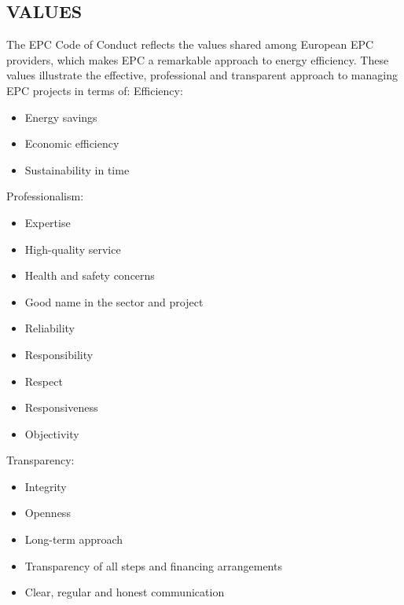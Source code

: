 \begin{multicols}{2}
\subsection{VALUES}
The EPC Code of Conduct reflects the values shared among European EPC
providers, which makes EPC a remarkable approach to energy efficiency. These
values illustrate the effective, professional and transparent approach to
managing EPC projects in terms of:
Efficiency:
\begin{itemize}
	\item	Energy savings
	\item	Economic efficiency
	\item	Sustainability in time
\end{itemize}
Professionalism:
\begin{itemize}
	\item	Expertise
	\item	High{-}quality service
	\item	Health and safety concerns
	\item	Good name in the sector and project
	\item	Reliability
	\item	Responsibility
	\item	Respect
	\item	Responsiveness
	\item	Objectivity
\end{itemize}
Transparency:
\begin{itemize}
	\item	Integrity
	\item	Openness
	\item	Long{-}term approach
	\item	Transparency of all steps and financing arrangements
	\item	Clear, regular and honest communication
\end{itemize}


\end{multicols}
